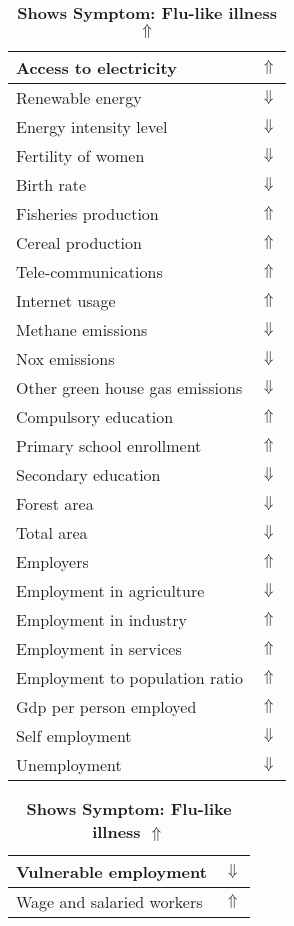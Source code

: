 \documentclass[12pt,notitlepage,oneside]{report}
\begin{document}
\begin{table}[!htb]
\caption{\textbf{Shows Symptom: Flu-like illness $\Uparrow$}}
\centering
\label{Correlated Socio-economic Factors0}
\begin{tabular}{|l|l|}
\hline
Access to electricity & $\Uparrow$\\ \hline
Renewable energy & $\Downarrow$\\ \hline
Energy intensity level & $\Downarrow$\\ \hline
Fertility of women & $\Downarrow$\\ \hline
Birth rate & $\Downarrow$\\ \hline
Fisheries production & $\Uparrow$\\ \hline
Cereal production & $\Uparrow$\\ \hline
Tele-communications & $\Uparrow$\\ \hline
Internet usage & $\Uparrow$\\ \hline
Methane emissions & $\Downarrow$\\ \hline
Nox emissions & $\Downarrow$\\ \hline
Other green house gas emissions & $\Downarrow$\\ \hline
Compulsory education & $\Uparrow$\\ \hline
Primary school enrollment & $\Uparrow$\\ \hline
Secondary education & $\Downarrow$\\ \hline
Forest area & $\Downarrow$\\ \hline
Total area & $\Downarrow$\\ \hline
Employers & $\Uparrow$\\ \hline
Employment in agriculture & $\Downarrow$\\ \hline
Employment in industry & $\Uparrow$\\ \hline
Employment in services & $\Uparrow$\\ \hline
Employment to population ratio & $\Uparrow$\\ \hline
Gdp per person employed & $\Uparrow$\\ \hline
Self employment & $\Downarrow$\\ \hline
Unemployment & $\Downarrow$\\ \hline
\end{tabular}
\begin{tabular}{|l|l|}
\hline
Vulnerable employment & $\Downarrow$\\ \hline
Wage and salaried workers & $\Uparrow$\\ \hline

\end{tabular}
\end{table}
\end{document}
